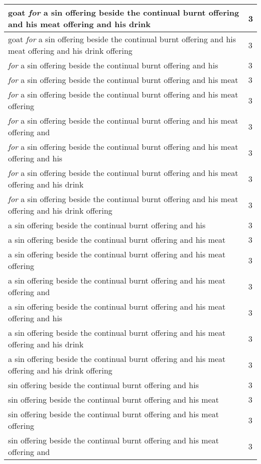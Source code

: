 \begin{center}
\begin{longtable}{|p{3.0in}|p{0.5in}|}
goat \emph{for} a sin offering beside the continual burnt offering and his meat offering and his drink & 3\\ \hline 
goat \emph{for} a sin offering beside the continual burnt offering and his meat offering and his drink offering & 3\\ \hline 
\emph{for} a sin offering beside the continual burnt offering and his & 3\\ \hline 
\emph{for} a sin offering beside the continual burnt offering and his meat & 3\\ \hline 
\emph{for} a sin offering beside the continual burnt offering and his meat offering & 3\\ \hline 
\emph{for} a sin offering beside the continual burnt offering and his meat offering and & 3\\ \hline 
\emph{for} a sin offering beside the continual burnt offering and his meat offering and his & 3\\ \hline 
\emph{for} a sin offering beside the continual burnt offering and his meat offering and his drink & 3\\ \hline 
\emph{for} a sin offering beside the continual burnt offering and his meat offering and his drink offering & 3\\ \hline 
a sin offering beside the continual burnt offering and his & 3\\ \hline 
a sin offering beside the continual burnt offering and his meat & 3\\ \hline 
a sin offering beside the continual burnt offering and his meat offering & 3\\ \hline 
a sin offering beside the continual burnt offering and his meat offering and & 3\\ \hline 
a sin offering beside the continual burnt offering and his meat offering and his & 3\\ \hline 
a sin offering beside the continual burnt offering and his meat offering and his drink & 3\\ \hline 
a sin offering beside the continual burnt offering and his meat offering and his drink offering & 3\\ \hline 
sin offering beside the continual burnt offering and his & 3\\ \hline 
sin offering beside the continual burnt offering and his meat & 3\\ \hline 
sin offering beside the continual burnt offering and his meat offering & 3\\ \hline 
sin offering beside the continual burnt offering and his meat offering and & 3\\ \hline 

\end{longtable}
\end{center}
